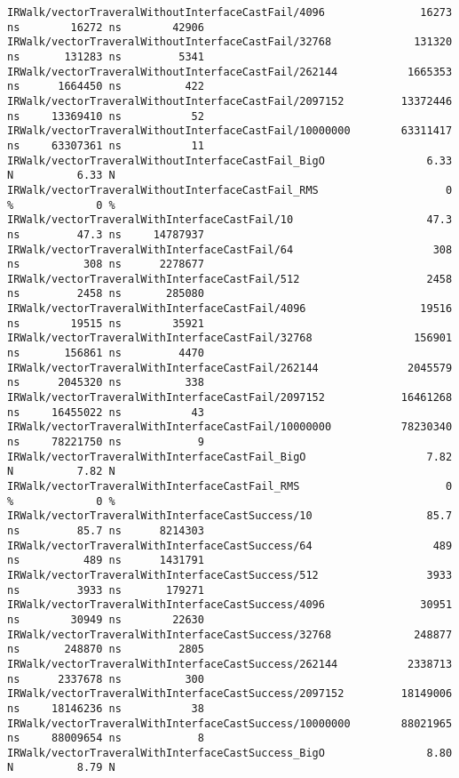 \begin{code}
\begin{verbatim}
IRWalk/vectorTraveralWithoutInterfaceCastFail/4096               16273 ns        16272 ns        42906
IRWalk/vectorTraveralWithoutInterfaceCastFail/32768             131320 ns       131283 ns         5341
IRWalk/vectorTraveralWithoutInterfaceCastFail/262144           1665353 ns      1664450 ns          422
IRWalk/vectorTraveralWithoutInterfaceCastFail/2097152         13372446 ns     13369410 ns           52
IRWalk/vectorTraveralWithoutInterfaceCastFail/10000000        63311417 ns     63307361 ns           11
IRWalk/vectorTraveralWithoutInterfaceCastFail_BigO                6.33 N          6.33 N
IRWalk/vectorTraveralWithoutInterfaceCastFail_RMS                    0 %             0 %
IRWalk/vectorTraveralWithInterfaceCastFail/10                     47.3 ns         47.3 ns     14787937
IRWalk/vectorTraveralWithInterfaceCastFail/64                      308 ns          308 ns      2278677
IRWalk/vectorTraveralWithInterfaceCastFail/512                    2458 ns         2458 ns       285080
IRWalk/vectorTraveralWithInterfaceCastFail/4096                  19516 ns        19515 ns        35921
IRWalk/vectorTraveralWithInterfaceCastFail/32768                156901 ns       156861 ns         4470
IRWalk/vectorTraveralWithInterfaceCastFail/262144              2045579 ns      2045320 ns          338
IRWalk/vectorTraveralWithInterfaceCastFail/2097152            16461268 ns     16455022 ns           43
IRWalk/vectorTraveralWithInterfaceCastFail/10000000           78230340 ns     78221750 ns            9
IRWalk/vectorTraveralWithInterfaceCastFail_BigO                   7.82 N          7.82 N
IRWalk/vectorTraveralWithInterfaceCastFail_RMS                       0 %             0 %
IRWalk/vectorTraveralWithInterfaceCastSuccess/10                  85.7 ns         85.7 ns      8214303
IRWalk/vectorTraveralWithInterfaceCastSuccess/64                   489 ns          489 ns      1431791
IRWalk/vectorTraveralWithInterfaceCastSuccess/512                 3933 ns         3933 ns       179271
IRWalk/vectorTraveralWithInterfaceCastSuccess/4096               30951 ns        30949 ns        22630
IRWalk/vectorTraveralWithInterfaceCastSuccess/32768             248877 ns       248870 ns         2805
IRWalk/vectorTraveralWithInterfaceCastSuccess/262144           2338713 ns      2337678 ns          300
IRWalk/vectorTraveralWithInterfaceCastSuccess/2097152         18149006 ns     18146236 ns           38
IRWalk/vectorTraveralWithInterfaceCastSuccess/10000000        88021965 ns     88009654 ns            8
IRWalk/vectorTraveralWithInterfaceCastSuccess_BigO                8.80 N          8.79 N

\end{verbatim}
\end{code}
